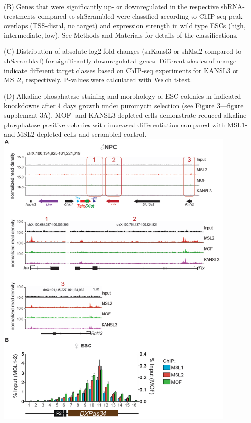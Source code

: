 \begin{footnotesize}
\begin{sffamily}
\begin{singlespacing}
(B) Genes that were significantly up- or downregulated in the respective shRNA-treatments compared to shScrambled were classified according to ChIP-seq peak overlaps (TSS-distal, no target) and expression strength in wild type ESCs (high, intermediate, low). See Methods and Materials for details of the classifications.

(C) Distribution of absolute log2 fold changes (shKansl3 or shMsl2 compared to shScrambled) for significantly downregulated genes. Different shades of orange indicate different target classes based on ChIP-seq experiments for KANSL3 or MSL2, respectively. P-values were calculated with Welch t-test.

(D) Alkaline phosphatase staining and morphology of ESC colonies in indicated knockdowns after 4 days growth under puromycin selection (see Figure 3—figure supplement 3A). MOF- and KANSL3-depleted cells demonstrate reduced alkaline phosphatase positive colonies with increased differentiation compared with MSL1- and MSL2-depleted cells and scrambled control.
\newpage
\includegraphics[width=0.9\textwidth]{Figures/Appendix/Figure5_supplemental_figure1_scissored.pdf}


\end{singlespacing}
\end{sffamily}
\end{footnotesize}
